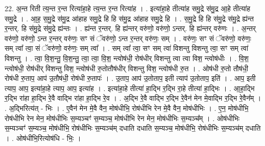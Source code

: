 \documentclass[17pt]{extarticle}
\begin{document}
22. अ॒न्त रिती त्य॒न्त र॒न्त रित्या॑हा॒हे त्य॒न्त र॒न्त रित्या॑ह । . इत्या॑हा॒हे तीत्या॑ह समु॒द्रे स॑मु॒द्र आ॒हे तीत्या॑ह समु॒द्रे । . आ॒ह॒ स॒मु॒द्रे स॑मु॒द्र आ॑हाह समु॒द्रे हि हि स॑मु॒द्र आ॑हाह समु॒द्रे हि । . स॒मु॒द्रे हि हि स॑मु॒द्रे स॑मु॒द्रे ह्य॑न्त र॒न्तर्. हि स॑मु॒द्रे स॑मु॒द्रे ह्य॑न्तः । . ह्य॑न्त र॒न्तर्. हि ह्य॑न्तर् वरु॑णो॒ वरु॑णो॒ ऽन्तर्. हि ह्य॑न्तर् वरु॑णः । . अ॒न्तर् वरु॑णो॒ वरु॑णो॒ ऽन्त र॒न्तर् वरु॑णः॒ सꣳ सं ॅवरु॑णो॒ ऽन्त र॒न्तर् वरु॑णः॒ सम् । . वरु॑णः॒ सꣳ सं ॅवरु॑णो॒ वरु॑णः॒ सम् त्वा᳚ त्वा॒ सं ॅवरु॑णो॒ वरु॑णः॒ सम् त्वा᳚ । . सम् त्वा᳚ त्वा॒ सꣳ सम् त्वा॑ विशन्तु विशन्तु त्वा॒ सꣳ सम् त्वा॑ विशन्तु । . त्वा॒ वि॒श॒न्तु॒ वि॒श॒न्तु॒ त्वा॒ त्वा॒ वि॒श॒ न्त्वोष॑धी॒ रोष॑धीर् विशन्तु त्वा त्वा विश॒ न्त्वोष॑धीः । . वि॒श॒ न्त्वोष॑धी॒ रोष॑धीर् विशन्तु विश॒ न्त्वोष॑धी रु॒तोतौष॑धीर् विशन्तु विश॒ न्त्वोष॑धी रु॒त । . ओष॑धी रु॒तो तौष॑धी॒ रोष॑धी रु॒ताप॒ आप॑ उ॒तौष॑धी॒ रोष॑धी रु॒तापः॑ । . उ॒ताप॒ आप॑ उ॒तोताप॒ इती त्याप॑ उ॒तोताप॒ इति॑ । . आप॒ इती त्याप॒ आप॒ इत्या॑हा॒हे त्याप॒ आप॒ इत्या॑ह । . इत्या॑हा॒हे तीत्या॑ हा॒द्भि र॒द्भि रा॒हे तीत्या॑ हा॒द्भिः । . आ॒हा॒द्भि र॒द्भि रा॑हा हा॒द्भि रे॒वै वाद्भि रा॑हा हा॒द्भि रे॒व । . अ॒द्भि रे॒वै वाद्भि र॒द्भि रे॒वैन॑ मेन मे॒वाद्भि र॒द्भि रे॒वैन᳚म् । . अ॒द्भिरित्य॑त् - भिः । . ए॒वैन॑ मेन मे॒वै वैन॒ मोष॑धीभि॒ रोष॑धीभि रेन मे॒वै वैन॒ मोष॑धीभिः । . ए॒न॒ मोष॑धीभि॒ रोष॑धीभि रेन मेन॒ मोष॑धीभिः स॒म्यञ्चꣳ॑ स॒म्यञ्च॒ मोष॑धीभि रेन मेन॒ मोष॑धीभिः स॒म्यञ्च᳚म् । . ओष॑धीभिः स॒म्यञ्चꣳ॑ स॒म्यञ्च॒ मोष॑धीभि॒ रोष॑धीभिः स॒म्यञ्च॑म् दधाति दधाति स॒म्यञ्च॒ मोष॑धीभि॒ रोष॑धीभिः स॒म्यञ्च॑म् दधाति । . ओष॑धीभि॒रित्योष॑धि - भिः॒ । \newline
\end{document}
